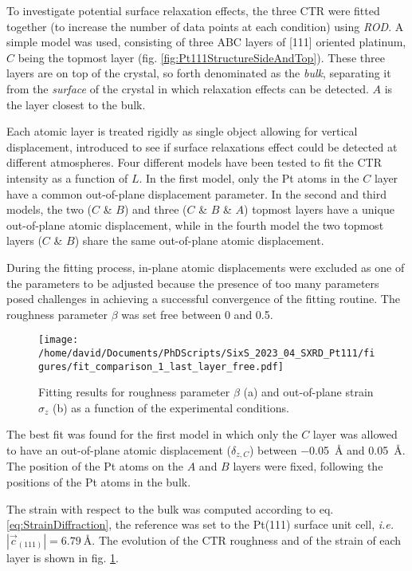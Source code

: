 To investigate potential surface relaxation effects, the three CTR were fitted together (to increase the number of data points at each condition) using \textit{ROD}.
A simple model was used, consisting of three ABC layers of [111] oriented platinum, $C$ being the topmost layer (fig. \ref{fig:Pt111StructureSideAndTop}).
These three layers are on top of the crystal, so forth denominated as the \textit{bulk}, separating it from the \textit{surface} of the crystal in which relaxation effects can be detected.
$A$ is the layer closest to the bulk.

Each atomic layer is treated rigidly as single object allowing for vertical displacement, introduced to see if surface relaxations effect could be detected at different atmospheres.
Four different models have been tested to fit the CTR intensity as a function of $L$.
In the first model, only the Pt atoms in the $C$ layer have a common out-of-plane displacement parameter.
In the second and third models, the two ($C$ \& $B$) and three ($C$ \& $B$ \& $A$) topmost layers have a unique out-of-plane atomic displacement, while in the fourth model the two topmost layers ($C$ \& $B$) share the same out-of-plane atomic displacement.

During the fitting process, in-plane atomic displacements were excluded as one of the parameters to be adjusted because the presence of too many parameters posed challenges in achieving a successful convergence of the fitting routine.
The roughness parameter $\beta$ was set free between 0 and 0.5.

\begin{figure}[!htb]
    \centering
    \texttt{[image: /home/david/Documents/PhDScripts/SixS\_2023\_04\_SXRD\_Pt111/figures/fit\_comparison\_1\_last\_layer\_free.pdf]}
    \caption{
        Fitting results for roughness parameter $\beta$ (a) and out-of-plane strain $\sigma_z$ (b) as a function of the experimental conditions.
    }
    \label{fig:CTRFit111}
\end{figure}

The best fit was found for the first model in which only the $C$ layer was allowed to have an out-of-plane atomic displacement ($\delta_{z, C}$) between \qty{-0.05}{\angstrom} and \qty{0.05}{\angstrom}.
The position of the Pt atoms on the $A$ and $B$ layers were fixed, following the positions of the Pt atoms in the bulk.

The strain with respect to the bulk was computed according to eq. \ref{eq:StrainDiffraction}, the reference was set to the Pt(111) surface unit cell, \textit{i.e.} $|\vec{c}_{(111)}| = \qty{6.79}{\angstrom}$.
The evolution of the CTR roughness and of the strain of each layer is shown in fig. \ref{fig:CTRFit111}.

